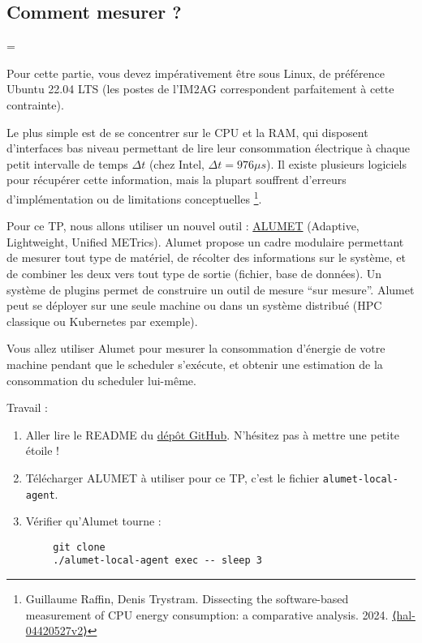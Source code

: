 \documentclass[a4paper,10pt]{article}
\newenvironment{information}
  {\par\begin{mdframed}[linewidth=2pt,linecolor=blue]%
    \begin{list}{}{\leftmargin=1cm
                   \labelwidth=\leftmargin}\item[\emoji{information}]}
  {\end{list}\end{mdframed}\par}
\begin{document}
\subsection{Comment mesurer ?}

\begin{information}
    Pour cette partie, vous devez impérativement être sous Linux, de préférence
    Ubuntu 22.04 LTS (les postes de l'IM2AG correspondent parfaitement à cette
    contrainte).
\end{information}
  

Le plus simple est de se concentrer sur le CPU et la RAM, qui disposent
d'interfaces bas niveau permettant de lire leur consommation électrique à chaque
petit intervalle de temps $\Delta t$ (chez Intel, $\Delta t = 976 \mu s$). Il
existe plusieurs logiciels pour récupérer cette information, mais la plupart
souffrent d'erreurs d'implémentation ou de limitations conceptuelles
\footnote{Guillaume Raffin, Denis Trystram. Dissecting the software-based
measurement of CPU energy consumption: a comparative analysis. 2024.
\href{https://hal.science/hal-04420527}{⟨hal-04420527v2⟩}}.

Pour ce TP, nous allons utiliser un nouvel outil :
\href{https://alumet.dev/}{ALUMET} (Adaptive, Lightweight, Unified METrics).
Alumet propose un cadre modulaire permettant de mesurer tout type de matériel,
de récolter des informations sur le système, et de combiner les deux vers tout
type de sortie (fichier, base de données). Un système de plugins permet de
construire un outil de mesure ``sur mesure''. Alumet peut se déployer sur une
seule machine ou dans un système distribué (HPC classique ou Kubernetes par
exemple).

Vous allez utiliser Alumet pour mesurer la consommation d'énergie de votre
machine pendant que le scheduler s'exécute, et obtenir une estimation de la
consommation du scheduler lui-même.

Travail :
\begin{enumerate}
    \item  Aller lire le README du \href{https://github.com/alumet-dev/alumet}{dépôt
    GitHub}. N'hésitez pas à mettre une petite étoile  ! 
    \item Télécharger ALUMET à utiliser pour ce TP,
    c'est le fichier \texttt{alumet-local-agent}. 
    \item Vérifier qu'Alumet tourne :
\end{enumerate}

\begin{jupytercode}
    \begin{lstlisting}
        git clone 
        ./alumet-local-agent exec -- sleep 3
    \end{lstlisting}    
\end{jupytercode}
\end{document}
